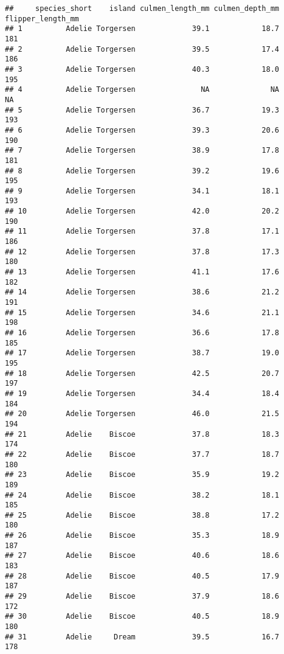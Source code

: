 \documentclass[
]{article}
\begin{document}
\begin{verbatim}
##     species_short    island culmen_length_mm culmen_depth_mm flipper_length_mm
## 1          Adelie Torgersen             39.1            18.7               181
## 2          Adelie Torgersen             39.5            17.4               186
## 3          Adelie Torgersen             40.3            18.0               195
## 4          Adelie Torgersen               NA              NA                NA
## 5          Adelie Torgersen             36.7            19.3               193
## 6          Adelie Torgersen             39.3            20.6               190
## 7          Adelie Torgersen             38.9            17.8               181
## 8          Adelie Torgersen             39.2            19.6               195
## 9          Adelie Torgersen             34.1            18.1               193
## 10         Adelie Torgersen             42.0            20.2               190
## 11         Adelie Torgersen             37.8            17.1               186
## 12         Adelie Torgersen             37.8            17.3               180
## 13         Adelie Torgersen             41.1            17.6               182
## 14         Adelie Torgersen             38.6            21.2               191
## 15         Adelie Torgersen             34.6            21.1               198
## 16         Adelie Torgersen             36.6            17.8               185
## 17         Adelie Torgersen             38.7            19.0               195
## 18         Adelie Torgersen             42.5            20.7               197
## 19         Adelie Torgersen             34.4            18.4               184
## 20         Adelie Torgersen             46.0            21.5               194
## 21         Adelie    Biscoe             37.8            18.3               174
## 22         Adelie    Biscoe             37.7            18.7               180
## 23         Adelie    Biscoe             35.9            19.2               189
## 24         Adelie    Biscoe             38.2            18.1               185
## 25         Adelie    Biscoe             38.8            17.2               180
## 26         Adelie    Biscoe             35.3            18.9               187
## 27         Adelie    Biscoe             40.6            18.6               183
## 28         Adelie    Biscoe             40.5            17.9               187
## 29         Adelie    Biscoe             37.9            18.6               172
## 30         Adelie    Biscoe             40.5            18.9               180
## 31         Adelie     Dream             39.5            16.7               178

\end{verbatim}
\end{document}

